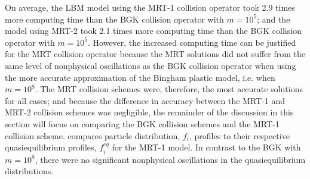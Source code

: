 On average, the LBM model using the MRT-1 collision operator took 2.9 times more computing time than the BGK collision operator with $m = 10^5$; and the model using MRT-2 took 2.1 times more computing time than the BGK collision operator with $m = 10^5$.
However, the increased computing time can be justified for the MRT collision operator because the MRT solutions did not suffer from the same level of nonphysical oscillations as the BGK collision operator when using the more accurate approximation of the Bingham plastic model, i.e. when $m = 10^8$. 
The MRT collision schemes were, therefore, the most accurate solutions for all cases; and because the difference in accuracy between the MRT-1 and MRT-2 collision schemes was negligible, the remainder of the discussion in this section will focus on comparing the BGK collision schemes and the MRT-1 collision scheme.
 compares particle distribution, $f_i$, profiles to their respective quasiequilibrium profiles, $f_i^{eq}$ for the MRT-1 model.
In contrast to the BGK with $m = 10^8$, there were no significant nonphysical oscillations in the quasiequilibrium distributions.

